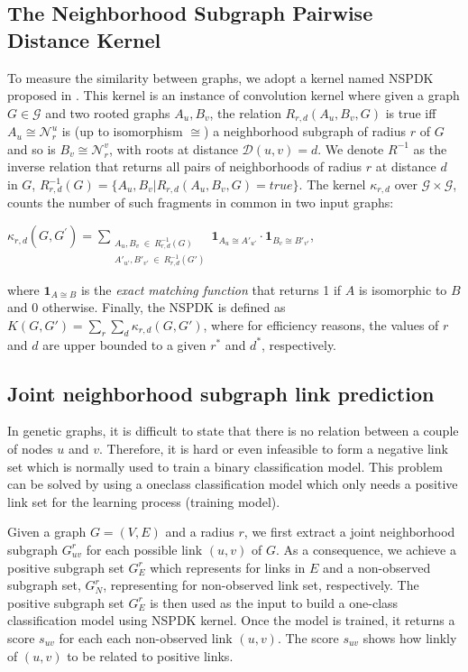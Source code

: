 \documentclass{article}
\begin{document}
\subsection{The Neighborhood Subgraph Pairwise Distance Kernel}
To measure the similarity between graphs, we adopt a kernel named NSPDK proposed in \cite{nspdk}. This kernel is an instance of convolution kernel \cite{covolution_kernel} where given a graph $G \in \mathcal{G}$ and two rooted graphs $A_u, B_v$, the relation $R_{r,d}(A_u, B_v, G)$ is true iff $A_u \cong \mathcal{N}_r^u$ is (up to isomorphism $\cong$) a neighborhood subgraph of radius $r$ of $G$ and so is $B_v \cong  \mathcal{N}_r^v$, with roots at distance $\mathcal{D}(u,v)= d$. We denote $R^{-1}$ as the inverse relation that returns all pairs of neighborhoods of radius $r$ at distance $d$ in $G$, $R^{-1}_{r,d}(G) = \lbrace A_u, B_v | R_{r,d}(A_u,B_v,G)=true\rbrace$. The kernel $\kappa_{r,d}$ over $\mathcal{G} \times \mathcal{G}$, counts the number of such fragments in common in two input graphs: 
\begin{center}
$\kappa_{r,d}(G,G^{'}) = 
\!\!\!\!\!\!\!\!\!\!\!\! 
\sum\limits_{\substack{A_u, B_v \ \in \ R_{r,d}^{-1}(G) \\ 
{A'}_{u'}, {B'}_{v'} \ \in \ R_{r,d}^{-1}(G')
}} \!\!\!\!\!\!\!\!\!\!\!\!  { { \textbf{1}_{A_{u} \cong A'_{u'}}} \cdot {
\textbf{1}_{B_{v} \cong B'_{v'}}} }$, 
\end{center} 
\noindent where $\textbf{1}_{A \cong B}$ is the \textit{exact matching function} that returns 1 if $A$ is isomorphic to $B$ and 0 otherwise.  Finally, the NSPDK is defined as $K(G,G') = \sum\limits_{r}{\sum\limits_{d}{\kappa_{r,d}(G,G')}}$, where for efficiency reasons, the values of $r$ and $d$ are upper bounded to a given $r^*$ and $d^*$, respectively.

\subsection{Joint neighborhood subgraph link prediction}
In genetic graphs, it is difficult to state that there is no relation between a couple of nodes $u$ and $v$. Therefore, it is hard or even infeasible to form a negative link set which is normally used to train a binary classification model. This problem can be solved by using a oneclass classification model which only needs a positive link set for the learning process (training model).

Given a graph $G = (V, E)$ and a radius $r$, we first extract a joint neighborhood subgraph $G_{uv}^r$ for each possible link $(u,v)$ of $G$. As a consequence, we achieve a positive subgraph set $G_E^r$ which represents for links in $E$ and  a non-observed subgraph set, $G_N^r$, representing for non-observed link set, respectively. The positive subgraph set $G_E^r$ is then used as the input to build a one-class classification model using NSPDK kernel. Once the model is trained, it returns a score $s_{uv}$ for each each non-observed link $(u,v)$. The score $s_{uv}$ shows how linkly of $(u,v)$ to be related to positive links.
\end{document}
